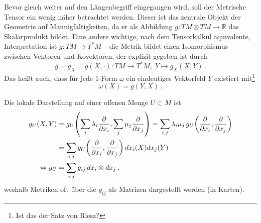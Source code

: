 \documentclass[../H_Analysis_main.tex]{subfiles}
\begin{document}
\iffalse
{
Auch für Riemannsche Metriken lässt sich eine lokale Darstellung berechnen. Mit einer Karte $x = (x_1, \dots, x_n): U \rightarrow \mathbb{R}^n$ auf der offenen Teilmenge $U \subset M$ sowie zwei Vektorfeldern $X, Y$ mit $v, w$ als lokalen Darstellungen an $p \in M$ gilt
\begin{equation}
g_U = \sum_{i, j} g_{ij} \, dx_i \otimes dx_j
\; \text{ mit } \; g_{ij} = g_U\qty(\pdv{x_i}, \pdv{x_j}): U \rightarrow \mathbb{R}
\end{equation}
Die Komponenten $g_{ij}$ werden dabei oft in eine Matrix geschrieben, um so eine praktische Darstellung des metrischen Tensors zu erhalten.
}
\fi


Bevor gleich weiter auf den Längenbegriff eingegangen wird, soll der Metrische Tensor ein wenig näher betrachtet werden. Dieser ist das zentrale Objekt der Geometrie auf Mannigfaltigkeiten, da er als Abbildung $g: TM \otimes TM \rightarrow \mathbb{R}$ das Skalarprodukt bildet. Eine andere wichtige, nach dem Tensorkalkül äquivalente, Interpretation ist $g: TM \rightarrow T^*M$ -- die Metrik bildet einen Isomorphismus zwischen Vektoren und Kovektoren, der explizit gegeben ist durch
\begin{equation}
g = g_X = g(X, \cdot): TM \rightarrow T^*M, \; Y \mapsto g_X(X, Y) \, .
\end{equation}
Das heißt auch, dass für jede 1-Form $\omega$ ein eindeutiges Vektorfeld $Y$ existiert mit\footnote{Ist das der Satz von Riesz?}
\begin{equation}
\omega(X) = g(Y, X) \, .
\end{equation}

Die lokale Darstellung auf einer offenen Menge $U \subset M$ ist
\begin{align}
g_U(X, Y) &= g_U\qty(\sum_i \lambda_i \pdv{x_i}, \sum_j \mu_j \pdv{x_j}) = \sum_{i, j} \lambda_i \mu_j \, g_U\qty(\pdv{x_i}, \pdv{x_j})
\notag\\
&= \sum_{i, j} g_U\qty(\pdv{x_i}, \pdv{x_j}) \, dx_i(X) dx_j(Y)
\notag\\
\Leftrightarrow g_U &= \sum_{i, j} g_{ij} \, dx_i \otimes dx_j \, ,
\end{align}
weshalb Metriken oft über die $g_{ij}$ als Matrizen dargestellt werden (in Karten).
\end{document}
